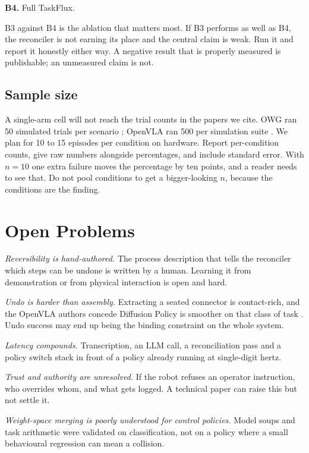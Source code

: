 \documentclass[conference]{IEEEtran}
\begin{document}
\textbf{B4.} Full TaskFlux.

B3 against B4 is the ablation that matters most. If B3 performs as well
as B4, the reconciler is not earning its place and the central claim is
weak. Run it and report it honestly either way. A negative result that is
properly measured is publishable; an unmeasured claim is not.

\subsection{Sample size}

A single-arm cell will not reach the trial counts in the papers we cite.
OWG ran 50 simulated trials per scenario \cite{owg}; OpenVLA ran 500 per
simulation suite \cite{openvla}. We plan for 10 to 15 episodes per
condition on hardware. Report per-condition counts, give raw numbers
alongside percentages, and include standard error. With $n{=}10$ one
extra failure moves the percentage by ten points, and a reader needs to
see that. Do not pool conditions to get a bigger-looking $n$, because the
conditions are the finding.

\section{Open Problems}
\label{sec:open}

\emph{Reversibility is hand-authored.} The process description that tells
the reconciler which steps can be undone is written by a human. Learning
it from demonstration or from physical interaction is open and hard.

\emph{Undo is harder than assembly.} Extracting a seated connector is
contact-rich, and the OpenVLA authors concede Diffusion Policy is
smoother on that class of task \cite{openvla}. Undo success may end up
being the binding constraint on the whole system.

\emph{Latency compounds.} Transcription, an LLM call, a reconciliation
pass and a policy switch stack in front of a policy already running at
single-digit hertz.

\emph{Trust and authority are unresolved.} If the robot refuses an
operator instruction, who overrides whom, and what gets logged. A
technical paper can raise this but not settle it.

\emph{Weight-space merging is poorly understood for control policies.}
Model soups and task arithmetic were validated on classification, not on
a policy where a small behavioural regression can mean a collision.
\end{document}
